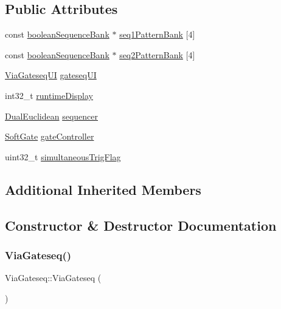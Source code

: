 \subsection*{Public Attributes}
\begin{DoxyCompactItemize}
\item 
const \mbox{\hyperlink{structboolean_sequence_bank}{boolean\+Sequence\+Bank}} $\ast$ \mbox{\hyperlink{class_via_gateseq_ad505b120d66ea6e9beb846d66a8021fa}{seq1\+Pattern\+Bank}} \mbox{[}4\mbox{]}
\item 
const \mbox{\hyperlink{structboolean_sequence_bank}{boolean\+Sequence\+Bank}} $\ast$ \mbox{\hyperlink{class_via_gateseq_a1faa904a07ea274aeff80dbb18f8518c}{seq2\+Pattern\+Bank}} \mbox{[}4\mbox{]}
\item 
\mbox{\hyperlink{class_via_gateseq_1_1_via_gateseq_u_i}{Via\+Gateseq\+UI}} \mbox{\hyperlink{class_via_gateseq_ae55cb2ce39ea0d6d614cd43f287f1151}{gateseq\+UI}}
\item 
int32\+\_\+t \mbox{\hyperlink{class_via_gateseq_a6234f09e46a196927229d2bd7e0c2ea0}{runtime\+Display}}
\item 
\mbox{\hyperlink{class_dual_euclidean}{Dual\+Euclidean}} \mbox{\hyperlink{class_via_gateseq_aade5918995b92e3f1fd8a3b07e0bd7f4}{sequencer}}
\item 
\mbox{\hyperlink{class_soft_gate}{Soft\+Gate}} \mbox{\hyperlink{class_via_gateseq_a07aca8cb788a3452736e585b82fd6826}{gate\+Controller}}
\item 
uint32\+\_\+t \mbox{\hyperlink{class_via_gateseq_ab15d726ba5d302f110c2fa9b516aac45}{simultaneous\+Trig\+Flag}}
\end{DoxyCompactItemize}
\subsection*{Additional Inherited Members}


\subsection{Constructor \& Destructor Documentation}
\mbox{\label{class_via_gateseq_ac0bb7455cf2081d645574d5274862591}} 
\subsubsection{\texorpdfstring{Via\+Gateseq()}{ViaGateseq()}}
{\footnotesize\ttfamily Via\+Gateseq\+::\+Via\+Gateseq (\begin{DoxyParamCaption}{ }\end{DoxyParamCaption})\hspace{0.3cm}{\ttfamily [inline]}}



